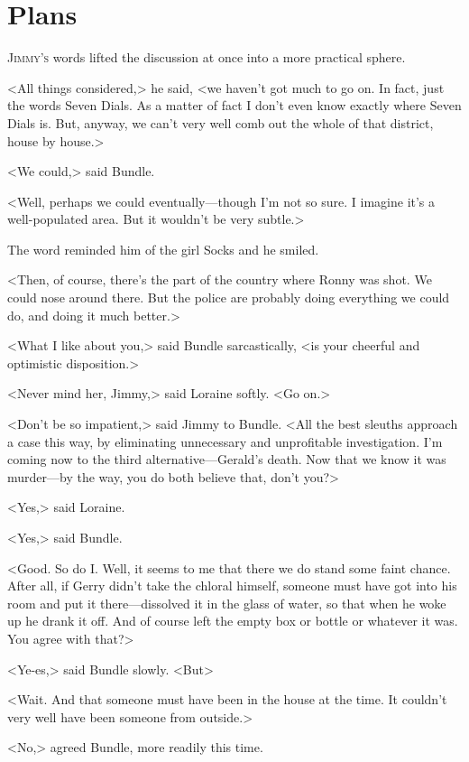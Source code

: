 \chapter{Plans}

\lettrine{J}{immy's} words lifted the discussion at once into a more practical sphere.

\zz
<All things considered,> he said, <we haven't got much to go on. In fact, just the words Seven Dials. As a matter of fact I don't even know exactly where Seven Dials is. But, anyway, we can't very well comb out the whole of that district, house by house.>

<We could,> said Bundle.

<Well, perhaps we could eventually—though I'm not so sure. I imagine it's a well-populated area. But it wouldn't be very subtle.>

The word reminded him of the girl Socks and he smiled.

<Then, of course, there's the part of the country where Ronny was shot. We could nose around there. But the police are probably doing everything we could do, and doing it much better.>

<What I like about you,> said Bundle sarcastically, <is your cheerful and optimistic disposition.>

<Never mind her, Jimmy,> said Loraine softly. <Go on.>

<Don't be so impatient,> said Jimmy to Bundle. <All the best sleuths approach a case this way, by eliminating unnecessary and unprofitable investigation. I'm coming now to the third alternative—Gerald's death. Now that we know it was murder—by the way, you do both believe that, don't you?>

<Yes,> said Loraine.

<Yes,> said Bundle.

<Good. So do I. Well, it seems to me that there we do stand some faint chance. After all, if Gerry didn't take the chloral himself, someone must have got into his room and put it there—dissolved it in the glass of water, so that when he woke up he drank it off. And of course left the empty box or bottle or whatever it was. You agree with that?>

<Ye-es,> said Bundle slowly. <But\longdash>

<Wait. And that someone must have been in the house at the time. It couldn't very well have been someone from outside.>

<No,> agreed Bundle, more readily this time.

